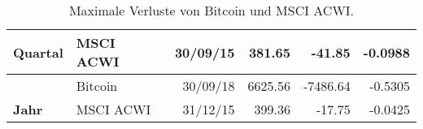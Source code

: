 \documentclass[a4paper,12pt]{article}
\begin{document}
\begin{table}[h]
{\begin{tabular}{ll|r|r|r|r|}
\multicolumn{1}{l|}{\multirow{-2}{*}{\textbf{Quartal}}} & {\color[HTML]{C0C0C0} MSCI ACWI} & {\color[HTML]{C0C0C0} 30/09/15} & {\color[HTML]{C0C0C0} 381.65} & {\color[HTML]{C0C0C0} -41.85} & {\color[HTML]{C0C0C0} -0.0988} \\ \hline
\multicolumn{1}{l|}{}                                   & Bitcoin                          & 30/09/18                        & 6625.56                       & -7486.64                      & -0.5305                        \\ \cline{2-6} 
\multicolumn{1}{l|}{\multirow{-2}{*}{\textbf{Jahr}}}    & {\color[HTML]{C0C0C0} MSCI ACWI} & {\color[HTML]{C0C0C0} 31/12/15} & {\color[HTML]{C0C0C0} 399.36} & {\color[HTML]{C0C0C0} -17.75} & {\color[HTML]{C0C0C0} -0.0425} \\ \hline
\end{tabular}
}\\
\caption{Maximale Verluste von Bitcoin und MSCI ACWI.}
\label{AnhangTab2}
\end{table}
\end{document}
